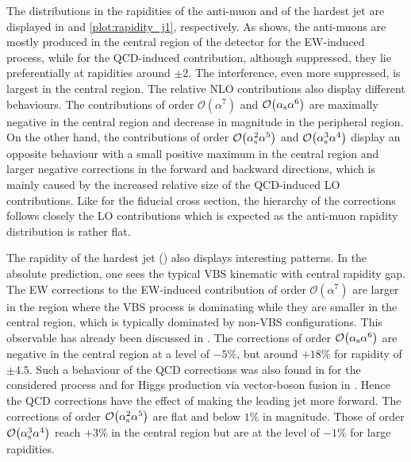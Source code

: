 \documentclass[a4article,11pt]{article}
\begin{document}
%
The distributions in the rapidities of the anti-muon and of the hardest
jet are displayed in  and
\ref{plot:rapidity_j1}, respectively.  As
 shows, the anti-muons are mostly
produced in the central region of the detector for the EW-induced process,
while for the QCD-induced contribution, although suppressed, they lie
preferentially at rapidities around $\pm2$. The interference, even
more suppressed, is largest in the central region.  The relative NLO
contributions also display different behaviours.  The contributions of
order $\mathcal{O}{\left(\alpha^{7}\right)}$ and
$\mathcal{O}{\left(\alpha_\text{s}\alpha^{6}\right)}$ are maximally
negative in the central region and decrease 
in magnitude
in the peripheral region.
On the other hand, the contributions of order
$\mathcal{O}{\left(\alpha_\text{s}^{2}\alpha^{5}\right)}$ and
$\mathcal{O}{\left(\alpha_\text{s}^{3}\alpha^{4}\right)}$ 
display an opposite behaviour with a 
small positive maximum in the central region and larger negative
corrections in the forward and backward directions, which is mainly
caused by the increased relative size of the QCD-induced LO
contributions.  
Like for the fiducial cross section, the hierarchy of
the corrections follows closely the LO contributions which is expected
as the anti-muon rapidity distribution is rather flat.

The rapidity of the hardest jet () also
displays interesting patterns.  In the absolute prediction, one sees
the typical VBS kinematic with central rapidity gap.
The EW corrections to the EW-induced contribution of order
$\mathcal{O}{\left(\alpha^{7}\right)}$ are larger in the region where
the VBS process is dominating while they are smaller in the central
region, which is typically dominated by non-VBS configurations.  This
observable has already been discussed in .
The corrections of order
  $\mathcal{O}{\left(\alpha_\text{s}\alpha^{6}\right)}$ are negative
  in the central region at a level of $-5\%$, but around
  $+18\%$ for rapidity of $\pm4.5$.  
Such a behaviour of the QCD
corrections was also found in  for the
considered process and for Higgs production via vector-boson fusion in
.  Hence the QCD corrections have the effect of
making the leading jet more forward.
The corrections of order
$\mathcal{O}{\left(\alpha_\text{s}^{2}\alpha^{5}\right)}$ 
are flat and below $1\%$ in magnitude. Those of order
$\mathcal{O}{\left(\alpha_\text{s}^{3}\alpha^{4}\right)}$ 
reach $+3\%$ in the central region but are at the level of $-1\%$ for
large rapidities. 
\end{document}
